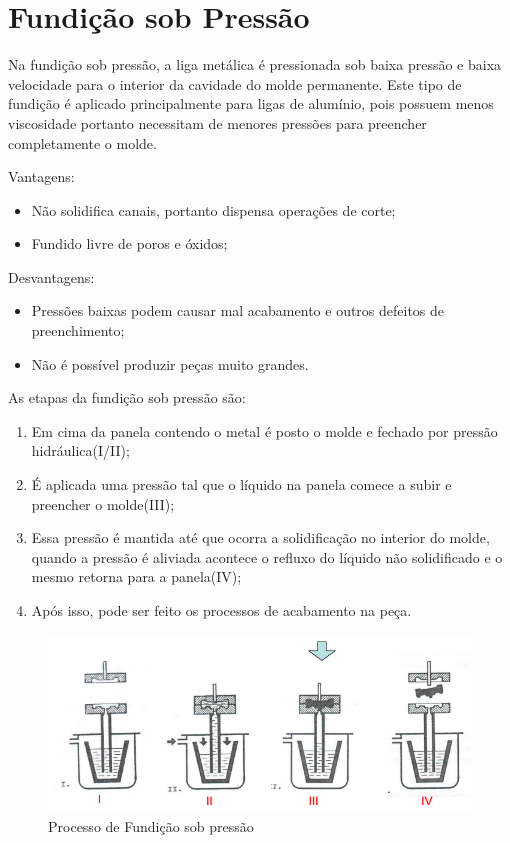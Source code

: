 \documentclass[a4paper, 12pt]{article}
\begin{document}
	\section{Fundição sob Pressão}
	Na fundição sob pressão, a liga metálica é pressionada sob baixa pressão e baixa velocidade para o interior da cavidade do molde permanente. Este tipo de fundição é aplicado principalmente para ligas de alumínio, pois possuem menos viscosidade portanto necessitam de menores pressões para preencher completamente o molde.
	
	Vantagens:	
	\begin{itemize}
		\item Não solidifica canais, portanto dispensa operações de corte;
		\item Fundido livre de poros e óxidos;
	\end{itemize}
	Desvantagens:
	\begin{itemize}
		\item Pressões baixas podem causar mal acabamento e outros defeitos de preenchimento;
		\item Não é possível produzir peças muito grandes.
	\end{itemize}
	
	As etapas da fundição sob pressão são:
	\begin{enumerate}
		\item Em cima da panela contendo o metal é posto o molde e fechado por pressão hidráulica(I/II);
		\item É aplicada uma pressão tal que o líquido na panela comece a subir e preencher o molde(III);
		\item Essa pressão é mantida até que ocorra a solidificação no interior do molde, quando a pressão é aliviada acontece o refluxo do líquido não solidificado e o mesmo retorna para a panela(IV);
		\item Após isso, pode ser feito os processos de acabamento na peça.
	\end{enumerate}
	
	\begin{figure}[h]
		\centering
		\includegraphics[scale=0.5]{9.png}
		\caption{Processo de Fundição sob pressão}
	\end{figure}
	
\end{document}
